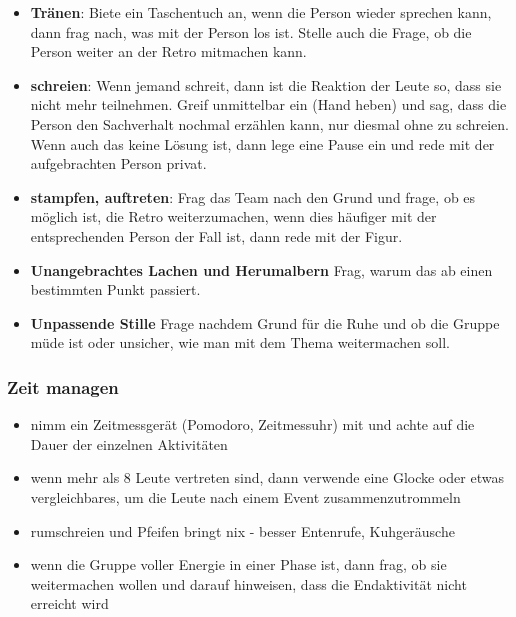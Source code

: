 \begin{itemize}
  \item \textbf{Tränen}: Biete ein Taschentuch an, wenn die Person wieder sprechen kann, dann
    frag nach, was mit der Person los ist. Stelle auch die Frage, ob die Person weiter an der
    Retro mitmachen kann.
  \item \textbf{schreien}: Wenn jemand schreit, dann ist die Reaktion der Leute so, dass sie
    nicht mehr teilnehmen. Greif unmittelbar ein (Hand heben) und sag, dass die Person den
    Sachverhalt nochmal erzählen kann, nur diesmal ohne zu schreien. Wenn auch das keine Lösung
    ist, dann lege eine Pause ein und rede mit der aufgebrachten Person privat.
  \item \textbf{stampfen, auftreten}: Frag das Team nach den Grund und frage, ob es möglich
    ist, die Retro weiterzumachen, wenn dies häufiger mit der entsprechenden Person der Fall
    ist, dann rede mit der Figur.
  \item \textbf{Unangebrachtes Lachen und Herumalbern} Frag, warum das ab einen bestimmten Punkt
    passiert.
  \item \textbf{Unpassende Stille} Frage nachdem Grund für die Ruhe und ob die Gruppe müde ist
    oder unsicher, wie man mit dem Thema weitermachen soll.
\end{itemize}


\subsubsection{Zeit managen}
\begin{itemize}
  \item nimm ein Zeitmessgerät (Pomodoro, Zeitmessuhr) mit und achte auf die Dauer der einzelnen Aktivitäten
  \item wenn mehr als 8 Leute vertreten sind, dann verwende eine Glocke oder etwas
    vergleichbares, um die Leute nach einem Event zusammenzutrommeln
  \item rumschreien und Pfeifen bringt nix - besser Entenrufe, Kuhgeräusche
  \item wenn die Gruppe voller Energie in einer Phase ist, dann frag, ob sie weitermachen
    wollen und darauf hinweisen, dass die Endaktivität nicht erreicht wird
\end{itemize}


